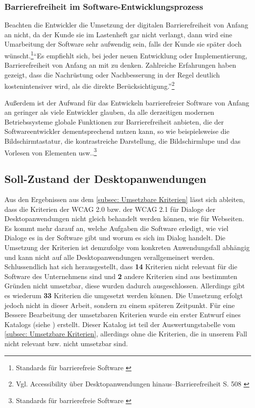 

\subsubsection{Barrierefreiheit im Software-Entwicklungsprozess}
Beachten die Entwickler die Umsetzung der digitalen Barrierefreiheit von Anfang an nicht, da der Kunde sie im Lastenheft gar nicht verlangt, dann wird eine Umarbeitung der Software sehr aufwendig sein, falls der Kunde sie später doch wünscht.\footnote{Standards für barrierefreie Software \cite{DEVINSIDER}}"`Es empfiehlt sich, bei jeder neuen Entwicklung oder Implementierung, Barrierefreiheit von Anfang an mit zu denken. Zahlreiche Erfahrungen haben gezeigt, dass die Nachrüstung oder Nachbesserung in der Regel deutlich kostenintensiver wird, als die direkte Berücksichtigung."'\footnote{Vgl. Accessibility über Desktopanwendungen hinaus–Barrierefreiheit S. 508 \cite{buhler2017accessibility}}
 
Außerdem ist der Aufwand für das Entwickeln barrierefreier Software von Anfang an geringer als viele Entwickler glauben, da alle  derzeitigen modernen Betriebssysteme globale Funktionen zur Barrierefreiheit anbieten, die der Softwareentwickler dementsprechend nutzen kann, so wie beispielsweise die Bildschirmtastatur, die kontrastreiche Darstellung, die Bildschirmlupe und das Vorlesen von Elementen usw..\footnote{Standards für barrierefreie Software \cite{DEVINSIDER}}

\subsection{Soll-Zustand der Desktopanwendungen}
\label{subsec: Soll-Zustand der Desktopanwendungen}

Aus den Ergebnissen aus dem \cref{subsec: Umsetzbare Kriterien} lässt sich ableiten, dass die Kriterien der \ac{WCAG} 2.0 bzw. der \ac{WCAG} 2.1 für Dialoge der Desktopanwendungen nicht gleich behandelt werden können, wie für Webseiten. Es kommt mehr darauf an, welche Aufgaben die Software erledigt, wie viel Dialoge es in der Software gibt und worum es sich im Dialog handelt. Die Umsetzung der Kriterien ist demzufolge vom konkreten Anwendungsfall abhängig und kann nicht auf alle Desktopanwendungen verallgemeinert werden. Schlussendlich hat sich herausgestellt, dass \textbf{14} Kriterien nicht relevant für die Software des Unternehmens sind und \textbf{2} andere Kriterien sind aus bestimmten Gründen nicht umsetzbar, diese wurden dadurch ausgeschlossen. Allerdings gibt es wiederum \textbf{33} Kriterien die umgesetzt werden können. Die Umsetzung erfolgt jedoch nicht in dieser Arbeit, sondern zu einem späteren Zeitpunkt. Für eine Bessere Bearbeitung der umsetzbaren Kriterien wurde ein erster Entwurf eines Katalogs (siehe ) erstellt. Dieser Katalog ist teil der Auswertungstabelle vom \cref{subsec: Umsetzbare Kriterien}, allerdings ohne die Kriterien, die in unserem Fall nicht relevant bzw. nicht umsetzbar sind.

